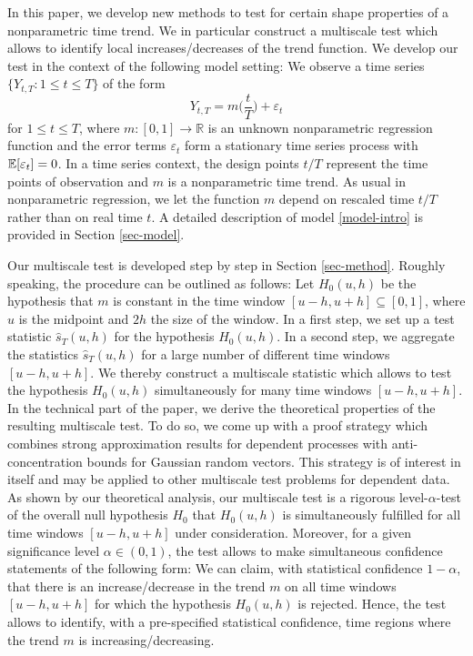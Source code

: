 In this paper, we develop new methods to test for certain shape properties of a nonparametric time trend. We in particular construct a multiscale test which allows to identify local increases/decreases of the trend function. 
We develop our test in the context of the following model setting: We observe a time series $\{ Y_{t,T}: 1 \le t \le T \}$ of the form 
\begin{equation}\label{model-intro}
Y_{t,T} = m \Big( \frac{t}{T} \Big) + \varepsilon_t
\end{equation}
for $1 \le t \le T$, where $m: [0,1] \rightarrow \mathbb{R}$ is an unknown nonparametric regression function and the error terms $\varepsilon_t$ form a stationary time series process with $\mathbb{E}[\varepsilon_t] = 0$. In a time series context, the design points $t/T$ represent the time points of observation and $m$ is a nonparametric time trend. As usual in nonparametric regression, we let the function $m$ depend on rescaled time $t/T$ rather than on real time $t$. A detailed description of model \eqref{model-intro} is provided in Section \ref{sec-model}.


Our multiscale test is developed step by step in Section \ref{sec-method}. Roughly speaking, the procedure can be outlined as follows: Let $H_0(u,h)$ be the hypothesis that $m$ is constant in the time window $[u-h,u+h] \subseteq [0,1]$, where $u$ is the midpoint and $2h$ the size of the window. In a first step, we set up a test statistic $\widehat{s}_T(u,h)$ for the hypothesis $H_0(u,h)$. In a second step, we aggregate the statistics $\widehat{s}_T(u,h)$ for a large number of different time windows $[u-h,u+h]$. We thereby construct a multiscale statistic which allows to test the hypothesis $H_0(u,h)$ simultaneously for many time windows $[u-h,u+h]$. In the technical part of the paper, we derive the theoretical properties of the resulting multiscale test. To do so, we come up with a proof strategy which combines strong approximation results for dependent processes with anti-concentration bounds for Gaussian random vectors. This strategy is of interest in itself and may be applied to other multiscale test problems for dependent data. As shown by our theoretical analysis, our multiscale test is a rigorous level-$\alpha$-test of the overall null hypothesis $H_0$ that $H_0(u,h)$ is simultaneously fulfilled for all time windows $[u-h,u+h]$ under consideration. Moreover, for a given significance level $\alpha \in (0,1)$, the test allows to make simultaneous confidence statements of the following form: We can claim, with statistical confidence $1-\alpha$, that there is an increase/decrease in the trend $m$ on all time windows $[u-h,u+h]$ for which the hypothesis $H_0(u,h)$ is rejected. Hence, the test allows to identify, with a pre-specified statistical confidence, time regions where the trend $m$ is increasing/decreasing. 


